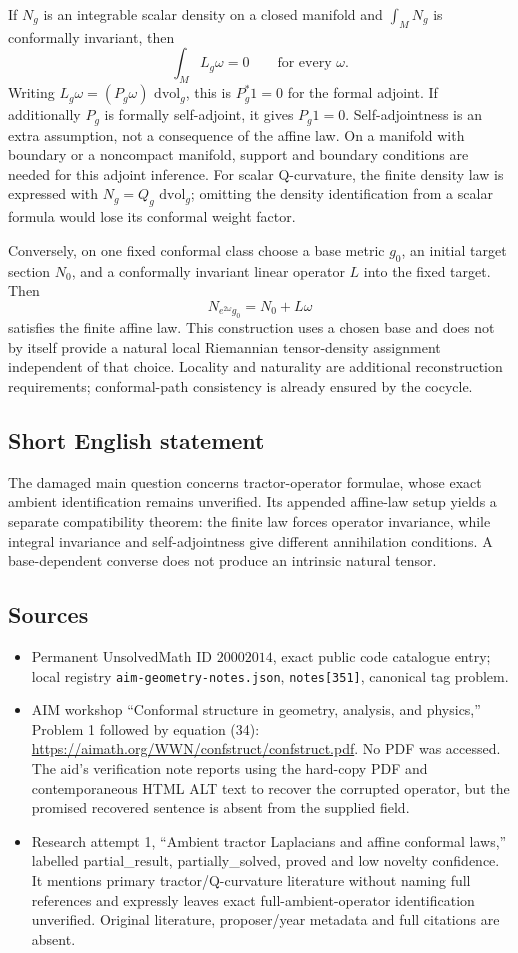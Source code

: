 \documentclass[11pt]{article}
\newcommand{\dd}{\,\mathrm{d}}
\begin{document}
If \(N_g\) is an integrable scalar density on a closed manifold and \(\int_MN_g\) is conformally invariant, then
\[
 \int_ML_g\omega=0\qquad\text{for every }\omega.
\]
Writing \(L_g\omega=(P_g\omega)\,\dd\mathrm{vol}_g\), this is \(P_g^*1=0\) for the formal adjoint. If additionally \(P_g\) is formally self-adjoint, it gives \(P_g1=0\). Self-adjointness is an extra assumption, not a consequence of the affine law. On a manifold with boundary or a noncompact manifold, support and boundary conditions are needed for this adjoint inference. For scalar Q-curvature, the finite density law is expressed with \(N_g=Q_g\,\dd\mathrm{vol}_g\); omitting the density identification from a scalar formula would lose its conformal weight factor.

Conversely, on one fixed conformal class choose a base metric \(g_0\), an initial target section \(N_0\), and a conformally invariant linear operator \(L\) into the fixed target. Then
\[
 N_{e^{2\omega}g_0}=N_0+L\omega
\]
satisfies the finite affine law. This construction uses a chosen base and does not by itself provide a natural local Riemannian tensor-density assignment independent of that choice. Locality and naturality are additional reconstruction requirements; conformal-path consistency is already ensured by the cocycle.
\subsection{Short English statement}
The damaged main question concerns tractor-operator formulae, whose exact ambient identification remains unverified. Its appended affine-law setup yields a separate compatibility theorem: the finite law forces operator invariance, while integral invariance and self-adjointness give different annihilation conditions. A base-dependent converse does not produce an intrinsic natural tensor.
\subsection{Sources}
\begin{itemize}
\item Permanent UnsolvedMath ID \(20002014\), exact public code catalogue entry; local registry \texttt{aim-geometry-notes.json}, \texttt{notes[351]}, canonical tag problem.
\item AIM workshop ``Conformal structure in geometry, analysis, and physics,'' Problem 1 followed by equation (34): \url{https://aimath.org/WWN/confstruct/confstruct.pdf}. No PDF was accessed. The aid's verification note reports using the hard-copy PDF and contemporaneous HTML ALT text to recover the corrupted operator, but the promised recovered sentence is absent from the supplied field.
\item Research attempt 1, ``Ambient tractor Laplacians and affine conformal laws,'' labelled partial\_result, partially\_solved, proved and low novelty confidence. It mentions primary tractor/Q-curvature literature without naming full references and expressly leaves exact full-ambient-operator identification unverified. Original literature, proposer/year metadata and full citations are absent.
\end{itemize}
\end{document}
